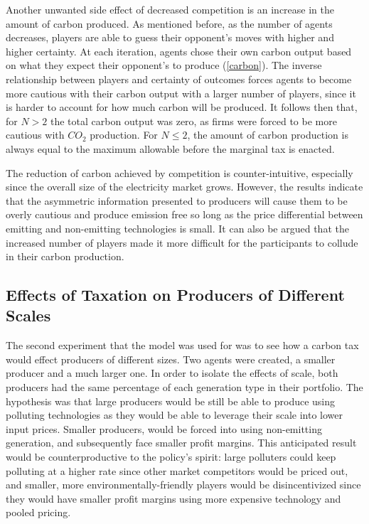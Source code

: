 \documentclass[12pt]{article}
\begin{document}
Another unwanted side effect of decreased competition is an increase in the amount of carbon produced. As mentioned before, as the number of agents decreases, players are able to guess their opponent's moves with higher and higher certainty. At each iteration, agents chose their own carbon output based on what they expect their opponent's to produce (\cref{carbon}). The inverse relationship between players and certainty of outcomes forces agents to become more cautious with their carbon output with a larger number of players, since it is harder to account for how much carbon will be produced. It follows then that, for $N>2$ the total carbon output was zero, as firms were forced to be more cautious with $CO_2$ production. For $N \leq 2$, the amount of carbon production is always equal to the maximum allowable before the marginal tax is enacted.\* 

The reduction of carbon achieved by competition is counter-intuitive, especially since the overall size of the electricity market grows. However, the results indicate that the asymmetric information presented to producers will cause them to be overly cautious and produce emission free so long as the price differential between emitting and non-emitting technologies is small. It can also be argued that the increased number of players made it more difficult for the participants to collude in their carbon production.

\subsection{Effects of Taxation on Producers of Different Scales} \label{scale}

The second experiment that the model was used for was to see how a carbon tax would effect producers of different sizes. Two agents were created, a smaller producer and a much larger one. In order to isolate the effects of scale, both producers had the same percentage of each generation type in their portfolio. The hypothesis was that large producers would be still be able to produce using polluting technologies as they would be able to leverage their scale into lower input prices. Smaller producers, would be forced into using non-emitting generation, and subsequently face smaller profit margins. This anticipated result would be counterproductive to the policy's spirit: large polluters could keep polluting at a higher rate since other market competitors would be priced out, and smaller, more environmentally-friendly players would be disincentivized since they would have smaller profit margins using more expensive technology and pooled pricing. \*
\end{document}
